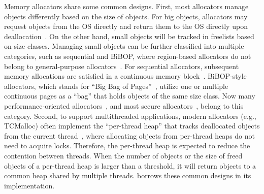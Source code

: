 Memory allocators share some common designs. First, most allocators manage objects differently based on the size of objects. For big objects, allocators may request objects from the OS directly and return them to the OS directly upon deallocation~\cite{Hoard}. On the other hand, small objects will be tracked in freelists based on size classes. Managing small objects can be further classified into multiple categories, such as sequential and BiBOP, where region-based allocators do not belong to general-purpose allocators~\cite{DieHarder, Gay:1998:MME:277650.277748}. 
For sequential allocators, subsequent memory allocations are satisfied in a continuous memory block~\cite{Cling}. BiBOP-style allocators, which stands for ``Big Bag of Pages''~\cite{hanson1980portable}, utilize one or multiple continuous pages as a ``bag'' that holds objects of the same size class. 
Now many performance-oriented allocators~\cite{tcmalloc, jemalloc, Scalloc}, and most secure allocators~\cite{openbsd, DieHarder, FreeGuard, Guarder}, belong to this category. Second, to support multithreaded applications, modern allocators (e.g., TCMalloc) often implement the ``per-thread heap'' that tracks deallocated objects from the current thread~\cite{tcmallocnew}, where allocating objects from per-thread heaps do not need to acquire locks. Therefore, the per-thread heap is expected to reduce the contention between threads. When the number of objects or the size of freed objects of a per-thread heap is larger than a threshold, it will return objects to a common heap shared by multiple threads. \NM{} borrows these common designs in its implementation. 

 